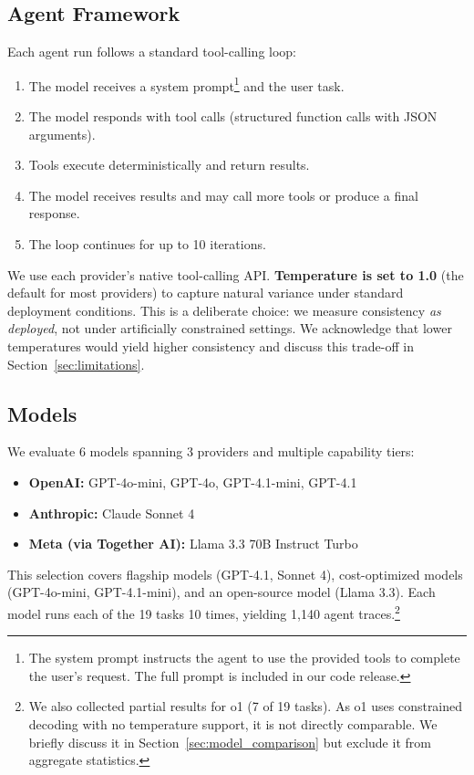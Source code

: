\documentclass[letterpaper]{article}
\begin{document}
\subsection{Agent Framework}

Each agent run follows a standard tool-calling loop:
\begin{enumerate}[nosep]
    \item The model receives a system prompt\footnote{The system prompt instructs the agent to use the provided tools to complete the user's request. The full prompt is included in our code release.} and the user task.
    \item The model responds with tool calls (structured function calls with JSON arguments).
    \item Tools execute deterministically and return results.
    \item The model receives results and may call more tools or produce a final response.
    \item The loop continues for up to 10 iterations.
\end{enumerate}

We use each provider's native tool-calling API. \textbf{Temperature is set to 1.0} (the default for most providers) to capture natural variance under standard deployment conditions. This is a deliberate choice: we measure consistency \textit{as deployed}, not under artificially constrained settings. We acknowledge that lower temperatures would yield higher consistency and discuss this trade-off in Section~\ref{sec:limitations}.

\subsection{Models}

We evaluate 6 models spanning 3 providers and multiple capability tiers:

\begin{itemize}[nosep]
    \item \textbf{OpenAI:} GPT-4o-mini, GPT-4o, GPT-4.1-mini, GPT-4.1
    \item \textbf{Anthropic:} Claude Sonnet 4
    \item \textbf{Meta (via Together AI):} Llama 3.3 70B Instruct Turbo
\end{itemize}

This selection covers flagship models (GPT-4.1, Sonnet 4), cost-optimized models (GPT-4o-mini, GPT-4.1-mini), and an open-source model (Llama 3.3). Each model runs each of the 19 tasks 10 times, yielding 1,140 agent traces.\footnote{We also collected partial results for o1 (7 of 19 tasks). As o1 uses constrained decoding with no temperature support, it is not directly comparable. We briefly discuss it in Section~\ref{sec:model_comparison} but exclude it from aggregate statistics.}
\end{document}
